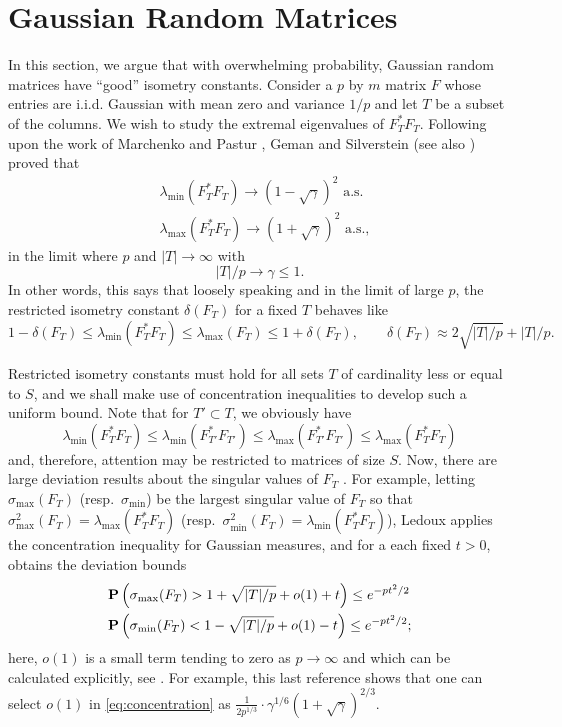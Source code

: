 \documentclass[11pt]{article}
\def\P{{\hbox{\bf P}}}
\newcommand{\<}{\langle}
\renewcommand{\>}{\rangle}
\newcommand{\goto}{\rightarrow}
\numberwithin{equation}{section}
\begin{document}
\section{Gaussian Random Matrices}
\label{sec:random}

In this section, we argue that with overwhelming probability, Gaussian
random matrices have ``good'' isometry constants. Consider a
$p$ by $m$ matrix $F$ whose entries are i.i.d. Gaussian with mean zero
and variance $1/p$ and let $T$ be a subset of the columns. We wish to
study the extremal eigenvalues of $F_T^* F_T$.
Following upon the work of Marchenko and Pastur
\cite{MarchenkoPastur}, Geman \cite{Geman} and Silverstein
\cite{Silverstein} (see also \cite{BaiYin}) proved that
\begin{align*}
  \label{eq:geman}
 & \lambda_{\min}(F_T^* F_T) \goto (1 - \sqrt{\gamma})^2 
\text{ a.s.}\\
 & \lambda_{\max}(F_T^* F_T) \goto (1 + \sqrt{\gamma})^2  \text{ a.s.},
\end{align*}
in the limit where $p$ and $|T| \goto \infty$ with
\[
|T|/p \goto \gamma \le 1.
\]
In other words, this says that loosely speaking and in the limit of
large $p$, the restricted isometry constant $\delta(F_T)$ for a fixed
$T$ behaves like
\[
1 - \delta(F_T) \le \lambda_{\min}(F_T^* F_T) \le \lambda_{\max}(F_T)
\le 1 + \delta(F_T), \qquad \delta(F_T) \approx 2 \sqrt{|T|/p} + |T|/p.
\]

Restricted isometry constants must hold for all sets $T$ of
cardinality less or equal to $S$, and we shall make use of
concentration inequalities to develop such a uniform bound. Note that
for $T' \subset T$, we obviously have
\[
\lambda_{\min}(F_T^* F_T) \le \lambda_{\min}(F_{T'}^* F_{T'}) \le
\lambda_{\max}(F_{T'}^* F_{T'}) \le \lambda_{\max}(F_T^* F_T)
\]
and, therefore, attention may be restricted to matrices of size $S$.
Now, there are large deviation results about the singular values of
$F_T$ \cite{Szarek2}. For example, letting $\sigma_{\max}(F_T)$
(resp.~$\sigma_{\min}$) be the largest singular value of $F_T$ so that
$\sigma^2_{\max}(F_T) = \lambda_{\max}(F_T^*F_T)$
(resp.~$\sigma^2_{\min}(F_T) = \lambda_{\min}(F_T^*F_T)$), Ledoux
\cite{LedouxAMS} applies the concentration inequality for Gaussian
measures, and for a each fixed $t > 0$, obtains the deviation bounds
\begin{align}
\label{eq:concentration}
&\P\left(\sigma_{\max}(F_T)   >   
1 + \sqrt{|T|/p} + o(1) + t\right) \le e^{- p t^2/2}\\
\label{eq:concentration2}
&\P\left(\sigma_{\min}(F_T)   < 
1 - \sqrt{|T|/p} + o(1) - t \right) \le e^{- p t^2/2};
\end{align}
here, $o(1)$ is a small term tending to zero as $p \goto \infty$ and
which can be calculated explicitly, see \cite{ElKarouiPhD}. For
example, this last reference shows that one can select $o(1)$ in
\eqref{eq:concentration} as $\frac{1}{2p^{1/3}} \cdot
\gamma^{1/6}(1+\sqrt{\gamma})^{2/3}$.
\end{document}
